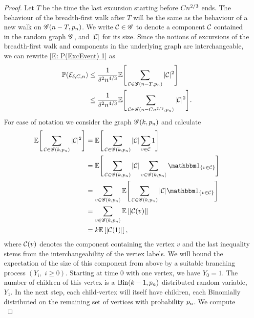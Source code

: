 \begin{proof}
	Let $T$ be the time the last excursion starting before $Cn^{2 / 3}$ ends.
	The behaviour of the breadth-first walk after $T$ will be the same as the behaviour of a new walk on $\mathscr{G}(n-T, p_n)$.
	We write $\mathcal{C} \in \mathscr{G}$ to denote a component $\mathcal{C}$ contained in the random graph $\mathscr{G}$,
	and $|\mathcal{C}|$ for its size.
	Since the notions of excursions of the breadth-first walk and components in the underlying graph are interchangeable,
	we can rewrite \eqref{E: P(ExcEvent) 1} as
	\begin{equation} \label{E: P(ExcEvent) 2}
	\begin{aligned}
	\mathbb{P}(\mathcal{E}_{\delta, C, n}) 
	&\leq \frac{1}{\delta^2n^{4 / 3}} \mathbb{E}\Bigg[ \sum_{\mathcal{C} \in \mathscr{G}(n-T, p_n)}  |\mathcal{C}|^2  \Bigg] \\
	&\leq \frac{1}{\delta^2n^{4 / 3}} \mathbb{E}\Bigg[ \sum_{\mathcal{C} \in \mathscr{G}(n-Cn^{2 / 3}, p_n)}  |\mathcal{C}|^2  \Bigg].
	\end{aligned}
	\end{equation}
	For ease of notation we consider the graph $\mathscr{G}(k,p_n)$ and calculate
	\begin{equation} \label{E: P(ExcEvent) 3}
	\begin{aligned}
	\mathbb{E}\Bigg[\sum_{\Ccal \in \Gcal(k, \p)} |\Ccal|^2 \Bigg] 
	&= \mathbb{E}\Bigg[ \sum_{\Ccal \in \Gcal(k, \p)} |\Ccal| \sum_{v \in \Ccal} 1\Bigg] \\
	&= \mathbb{E}\Bigg[ \sum_{\Ccal \in \Gcal(k, \p)} |\Ccal| \sum_{v \in \Gcal(k, \p)} \Ind{\{v \in \Ccal\}} \Bigg] \\
	&= \sum_{v \in \Gcal(k, \p)} \mathbb{E}\Bigg[ \sum_{\Ccal \in \Gcal(k, \p)} |\Ccal| \Ind{\{v \in \Ccal\}} \Bigg] \\ 
	&= \sum_{v \in \Gcal(k, \p)} \Exp{|\Ccal(v)|} \\
	&= k \Exp{|\Ccal(1)|},
	\end{aligned}
	\end{equation}
	where $\mathcal{C}(v)$ denotes the component containing the vertex $v$ and the last inequality stems from the interchangeability of the vertex labels.
	We will bound the expectation of the size of this component from above by a suitable branching process $(Y_i, \; i\geq 0)$.
	Starting at time $0$ with one vertex, we have $Y_0 = 1$.
	The number of children of this vertex is a $\operatorname*{Bin}(k-1, p_n)$ distributed random variable, $Y_1$.
	In the next step, each child-vertex will itself have children,
	each Binomially distributed on the remaining set of vertices with probability $ p_n$.
	We compute 
	\begin{equation*}

\end{equation*}
\end{proof}
